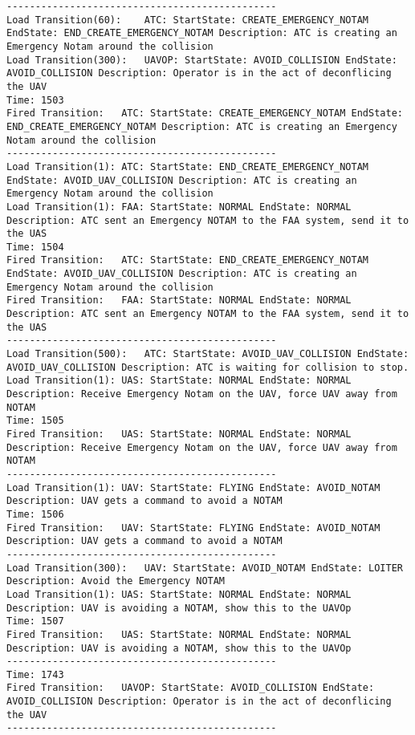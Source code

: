 \begin{spacing}{1}
\begin{verbatim}
-----------------------------------------------
Load Transition(60):	ATC: StartState: CREATE_EMERGENCY_NOTAM EndState: END_CREATE_EMERGENCY_NOTAM Description: ATC is creating an Emergency Notam around the collision
Load Transition(300):	UAVOP: StartState: AVOID_COLLISION EndState: AVOID_COLLISION Description: Operator is in the act of deconflicing the UAV
Time: 1503
Fired Transition:	ATC: StartState: CREATE_EMERGENCY_NOTAM EndState: END_CREATE_EMERGENCY_NOTAM Description: ATC is creating an Emergency Notam around the collision
-----------------------------------------------
Load Transition(1):	ATC: StartState: END_CREATE_EMERGENCY_NOTAM EndState: AVOID_UAV_COLLISION Description: ATC is creating an Emergency Notam around the collision
Load Transition(1):	FAA: StartState: NORMAL EndState: NORMAL Description: ATC sent an Emergency NOTAM to the FAA system, send it to the UAS
Time: 1504
Fired Transition:	ATC: StartState: END_CREATE_EMERGENCY_NOTAM EndState: AVOID_UAV_COLLISION Description: ATC is creating an Emergency Notam around the collision
Fired Transition:	FAA: StartState: NORMAL EndState: NORMAL Description: ATC sent an Emergency NOTAM to the FAA system, send it to the UAS
-----------------------------------------------
Load Transition(500):	ATC: StartState: AVOID_UAV_COLLISION EndState: AVOID_UAV_COLLISION Description: ATC is waiting for collision to stop.
Load Transition(1):	UAS: StartState: NORMAL EndState: NORMAL Description: Receive Emergency Notam on the UAV, force UAV away from NOTAM
Time: 1505
Fired Transition:	UAS: StartState: NORMAL EndState: NORMAL Description: Receive Emergency Notam on the UAV, force UAV away from NOTAM
-----------------------------------------------
Load Transition(1):	UAV: StartState: FLYING EndState: AVOID_NOTAM Description: UAV gets a command to avoid a NOTAM
Time: 1506
Fired Transition:	UAV: StartState: FLYING EndState: AVOID_NOTAM Description: UAV gets a command to avoid a NOTAM
-----------------------------------------------
Load Transition(300):	UAV: StartState: AVOID_NOTAM EndState: LOITER Description: Avoid the Emergency NOTAM
Load Transition(1):	UAS: StartState: NORMAL EndState: NORMAL Description: UAV is avoiding a NOTAM, show this to the UAVOp
Time: 1507
Fired Transition:	UAS: StartState: NORMAL EndState: NORMAL Description: UAV is avoiding a NOTAM, show this to the UAVOp
-----------------------------------------------
Time: 1743
Fired Transition:	UAVOP: StartState: AVOID_COLLISION EndState: AVOID_COLLISION Description: Operator is in the act of deconflicing the UAV
-----------------------------------------------

\end{verbatim}
\end{spacing}

